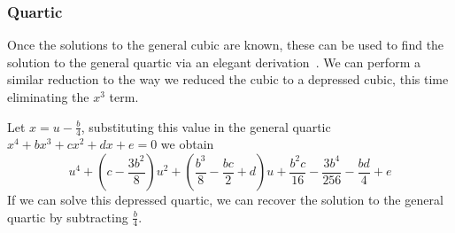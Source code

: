 \documentclass{article} %
\theoremstyle{plain}
\theoremstyle{definition}
\begin{document}
\subsubsection{Quartic}
\label{sec:intro:quartic}

Once the solutions to the general cubic are known,
these can be used to find the solution to the general quartic
via an elegant derivation~\cite{brookfield_factoring_quartic_polys}.
We can perform a similar reduction to the way we reduced the cubic to a depressed cubic, this time eliminating the $x^3$ term.

Let $x = u - \frac{b}{4}$, substituting this value
in the general quartic $x^4 + bx^3 + cx^2 + dx + e = 0$
we obtain
\begin{equation}
u^4 + \left(c -\frac{3b^2}{8}\right)u^2 + \left(\frac{b^3}{8} - \frac{bc}{2} + d\right)u  + \frac{b^2c}{16} - \frac{3b^4}{256} - \frac{bd}{4} + e
\end{equation}
%
If we can solve this depressed quartic, we can recover the solution to the general quartic by subtracting $\frac{b}{4}$.
\end{document}
